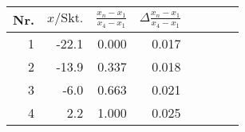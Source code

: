 \begin{tabular}{rrrrrrrr}
\toprule
Nr. & $x/\mathrm{Skt.}$ & $\frac{x_n-x_1}{x_4-x_1}$ & $\Delta\frac{x_n-x_1}{x_4-x_1}$ \\
\midrule
1 & -22.1 & 0.000 & 0.017 \\
2 & -13.9 & 0.337 & 0.018 \\
3 & -6.0 & 0.663 & 0.021 \\
4 & 2.2 & 1.000 & 0.025 \\
\bottomrule
\end{tabular}
